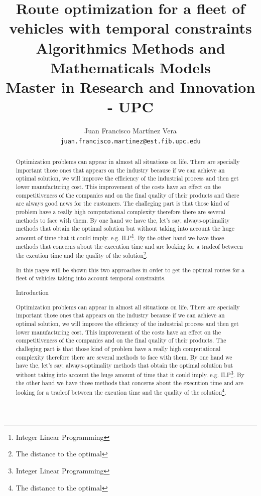 \documentclass[]{report}
\title{{\Huge Route optimization for a fleet of vehicles with temporal constraints} \\
Algorithmics Methods and Mathematicals Models \\
Master in Research and Innovation - UPC}
\author{Juan Francisco Mart\'inez Vera \\
{\tt juan.francisco.martinez@est.fib.upc.edu}}
\begin{document}
\maketitle

\newcommand{\localtextbulletone}{\textcolor{gray}{\raisebox{.50ex}{\rule{.6ex}{.6ex}}}}
\renewcommand{\labelitemi}{\localtextbulletone}

\begin{abstract}
	Optimization problems can appear in almost all situations on life. There are specially important those ones that appears on the industry because if we can achieve an optimal solution, we will improve the efficiency of the industrial process and then get lower manufacturing cost. This improvement of the costs have an effect on the competitiveness of the companies and on the final quality of their products and there are always good news for the customers. The challeging part is that those kind of problem have a really high computational complexity therefore there are several methods to face with them. By one hand we have the, let's say, always-optimality methods that obtain the optimal solution but without taking into account the huge amount of time that it could imply. e.g. ILP\footnote{Integer Linear Programming}. By the other hand we have those methods that concerns about the execution time and are looking for a tradeof between the exeution time and the quality of the solution\footnote{The distance to the optimal}.
	
	In this pages will be shown this two approaches in order to get the optimal routes for a fleet of vehicles taking into account temporal constraints.
	
\tableofcontents
	
\chapter{Introduction}
	Optimization problems can appear in almost all situations on life. There are specially important those ones that appears on the industry because if we can achieve an optimal solution, we will improve the efficiency of the industrial process and then get lower manufacturing cost. This improvement of the costs have an effect on the competitiveness of the companies and on the final quality of their products. The challeging part is that those kind of problem have a really high computational complexity therefore there are several methods to face with them. By one hand we have the, let's say, always-optimality methods that obtain the optimal solution but without taking into account the huge amount of time that it could imply. e.g. ILP\footnote{Integer Linear Programming}. By the other hand we have those methods that concerns about the execution time and are looking for a tradeof between the exeution time and the quality of the solution\footnote{The distance to the optimal}.
	

\end{abstract}
\end{document}
